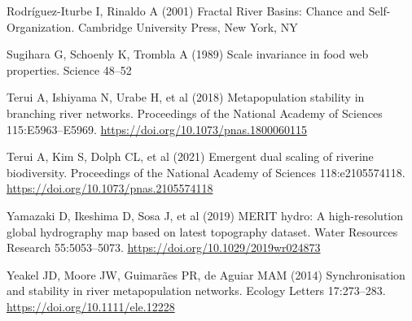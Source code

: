 \documentclass[
  12pt,
]{article}
\newlength{\cslhangindent}
\newlength{\cslentryspacingunit} %
\newenvironment{CSLReferences}[2] %
 {%
  \setlength{\parindent}{0pt}
  \ifodd #1
  \let\oldpar\par
  \def\par{\hangindent=\cslhangindent\oldpar}
  \fi
  \setlength{\parskip}{#2\cslentryspacingunit}
 }%
 {}
\begin{document}
\begin{CSLReferences}{1}{0}
\leavevmode{}%
Rodríguez-Iturbe I, Rinaldo A (2001) Fractal {River Basins}: {Chance} and {Self-Organization}. {Cambridge University Press}, {New York, NY}

\leavevmode{}%
Sugihara G, Schoenly K, Trombla A (1989) Scale invariance in food web properties. Science 48--52

\leavevmode{}%
Terui A, Ishiyama N, Urabe H, et al (2018) Metapopulation stability in branching river networks. Proceedings of the National Academy of Sciences 115:E5963--E5969. \url{https://doi.org/10.1073/pnas.1800060115}

\leavevmode{}%
Terui A, Kim S, Dolph CL, et al (2021) Emergent dual scaling of riverine biodiversity. Proceedings of the National Academy of Sciences 118:e2105574118. \url{https://doi.org/10.1073/pnas.2105574118}

\leavevmode{}%
Yamazaki D, Ikeshima D, Sosa J, et al (2019) {MERIT} hydro: A high-resolution global hydrography map based on latest topography dataset. Water Resources Research 55:5053--5073. \url{https://doi.org/10.1029/2019wr024873}

\leavevmode{}%
Yeakel JD, Moore JW, Guimarães PR, de Aguiar MAM (2014) Synchronisation and stability in river metapopulation networks. Ecology Letters 17:273--283. \url{https://doi.org/10.1111/ele.12228}

\end{CSLReferences}
\end{document}
